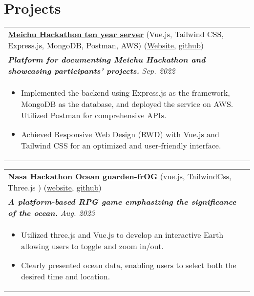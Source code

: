 \documentclass[a4paper,8pt]{article}
\begin{document}
\section{Projects}
\begin{tabularx}{\linewidth}{ @{}l r@{} }
\color[HTML]{0000cd} \textbf{\uline{\href{https://tenyear.meichuhackathon.org/}{Meichu Hackathon ten year server}}} \color[HTML]{371e77} (Vue.js, Tailwind CSS, Express.js, MongoDB, Postman, AWS)  \hfill \color[HTML]{371e77} (\href{https://github.com/}{Website}, \href{https://github.com/orgs/Official-Meichu-Hackathon/repositories}{github})\\ 
\color[HTML]{371e77}\textbf{\textit{Platform for documenting Meichu Hackathon and showcasing participants' projects.}} \hfill \color[HTML]{4B28A4} \textit{Sep. 2022} \\[2pt]
\begin{minipage}[t]{\linewidth}
    \begin{itemize}[nosep,after=\strut, leftmargin=2em, itemsep=2pt]
        \item Implemented the backend using Express.js as the framework, MongoDB as the database, and deployed the service on AWS. Utilized Postman for comprehensive APIs. 
        \item Achieved Responsive Web Design (RWD) with Vue.js and Tailwind CSS for an optimized and user-friendly interface.
    \end{itemize}
    \end{minipage}
\end{tabularx}
\begin{tabularx}{\linewidth}{ @{}l r@{} }
\color[HTML]{0000cd} \textbf{\uline{\href{https://fr-og-nasahackathon-1b6k-8gn495ml7-icesplendents-projects.vercel.app/}{Nasa Hackathon Ocean guarden-frOG}}} \color[HTML]{371e77} (vue.js, TailwindCss, Three.js ) \hfill \color[HTML]{0000cd}(\href{https://fr-og-nasahackathon-1b6k-8gn495ml7-icesplendents-projects.vercel.app/game}{website}, \href{https://github.com/icesplendent/frOG-NASAHACKATHON}{github}) \\
\color[HTML]{371e77}\textbf{\textit{A platform-based RPG game emphasizing the significance of the ocean. }} \hfill \color[HTML]{4B28A4} \textit{Aug. 2023} \\[2pt]
\begin{minipage}[t]{\linewidth}
    \begin{itemize}[nosep,after=\strut, leftmargin=2em, itemsep=2pt]
        \item Utilized three.js and Vue.js to develop an interactive Earth allowing users to toggle and zoom in/out.
        \item Clearly presented ocean data, enabling users to select both the desired time and location.
    \end{itemize}
    \end{minipage}
\end{tabularx}
\end{document}
